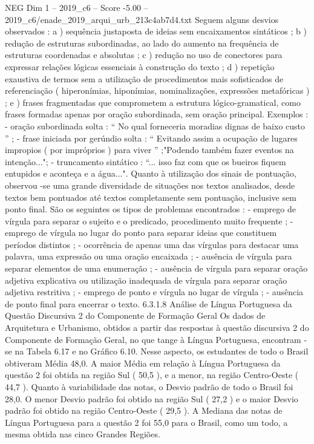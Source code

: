 \begin{textsample}{NEG Dim 1 – 2019\_c6 – Score -5.00 – 2019\_c6/enade\_2019\_arqui\_urb\_213c4ab7d4.txt}
Seguem alguns desvios observados : a ) sequência justaposta de ideias sem encaixamentos sintáticos ; b ) redução de estruturas subordinadas, ao lado do aumento na frequência de estruturas coordenadas e absolutas ; c ) redução no uso de conectores para expressar relações lógicas essenciais à construção do texto ; d ) repetição exaustiva de termos sem a utilização de procedimentos mais sofisticados de referenciação ( hiperonímias, hiponímias, nominalizações, expressões metafóricas ) ; e ) frases fragmentadas que comprometem a estrutura lógico-gramatical, como frases formadas apenas por oração subordinada, sem oração principal.
Exemplos : - oração subordinada solta : “ No qual forneceria moradias dignas de baixo custo ” ; - frase iniciada por gerúndio solta : “ Evitando assim a ocupação de lugares impropios ( por impróprios ) para viver ” ;"Podendo também fazer eventos na intenção..."; - truncamento sintático : “... isso faz com que os bueiros fiquem entupidos e aconteça e a água...".
Quanto à utilização dos sinais de pontuação, observou -se uma grande diversidade de situações nos textos analisados, desde textos bem pontuados até textos completamente sem pontuação, inclusive sem ponto final.
São os seguintes os tipos de problemas encontrados : - emprego de vírgula para separar o sujeito e o predicado, procedimento muito frequente ; - emprego de vírgula no lugar do ponto para separar ideias que constituem períodos distintos ; - ocorrência de apenas uma das vírgulas para destacar uma palavra, uma expressão ou uma oração encaixada ; - ausência de vírgula para separar elementos de uma enumeração ; - ausência de vírgula para separar oração adjetiva explicativa ou utilização inadequada de vírgula para separar oração adjetiva restritiva ; - emprego de ponto e vírgula no lugar de vírgula ; - ausência de ponto final para encerrar o texto. 6.3.1.8 Análise de Língua Portuguesa da Questão Discursiva 2 do Componente de Formação Geral Os dados de Arquitetura e Urbanismo, obtidos a partir das respostas à questão discursiva 2 do Componente de Formação Geral, no que tange à Língua Portuguesa, encontram -se na Tabela 6.17 e no Gráfico 6.10.
Nesse aspecto, os estudantes de todo o Brasil obtiveram Média 48,0.
A maior Média em relação à Língua Portuguesa da questão 2 foi obtida na região Sul ( 50,5 ), e a menor, na região Centro-Oeste ( 44,7 ).
Quanto à variabilidade das notas, o Desvio padrão de todo o Brasil foi 28,0.
O menor Desvio padrão foi obtido na região Sul ( 27,2 ) e o maior Desvio padrão foi obtido na região Centro-Oeste ( 29,5 ).
A Mediana das notas de Língua Portuguesa para a questão 2 foi 55,0 para o Brasil, como um todo, a mesma obtida nas cinco Grandes Regiões.

\end{textsample}
